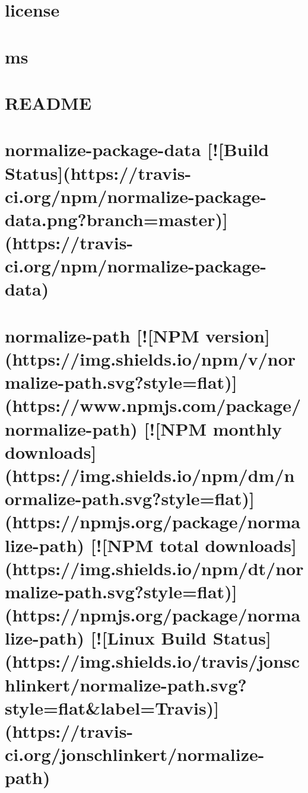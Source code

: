 \documentclass[twoside]{book}
\newcommand{\+}{\discretionary{\mbox{\scriptsize$\hookleftarrow$}}{}{}}
\begin{document}
\chapter{license}
\label{md_dsmacc_examples_DRmerge_node_modules_ms_license}

\chapter{ms}
\label{md_dsmacc_examples_DRmerge_node_modules_ms_readme}

\chapter{R\+E\+A\+D\+ME}
\label{md_dsmacc_examples_DRmerge_node_modules_nopt_README}

\chapter{normalize-\/package-\/data \mbox{[}!\mbox{[}Build Status\mbox{]}(https\+://travis-\/ci.org/npm/normalize-\/package-\/data.png?branch=master)\mbox{]}(https\+://travis-\/ci.org/npm/normalize-\/package-\/data)}
\label{md_dsmacc_examples_DRmerge_node_modules_normalize-package-data_README}

\chapter{normalize-\/path \mbox{[}!\mbox{[}N\+PM version\mbox{]}(https\+://img.shields.\+io/npm/v/normalize-\/path.svg?style=flat)\mbox{]}(https\+://www.npmjs.\+com/package/normalize-\/path) \mbox{[}!\mbox{[}N\+PM monthly downloads\mbox{]}(https\+://img.shields.\+io/npm/dm/normalize-\/path.svg?style=flat)\mbox{]}(https\+://npmjs.org/package/normalize-\/path) \mbox{[}!\mbox{[}N\+PM total downloads\mbox{]}(https\+://img.shields.\+io/npm/dt/normalize-\/path.svg?style=flat)\mbox{]}(https\+://npmjs.org/package/normalize-\/path) \mbox{[}!\mbox{[}Linux Build Status\mbox{]}(https\+://img.shields.\+io/travis/jonschlinkert/normalize-\/path.svg?style=flat\&label=Travis)\mbox{]}(https\+://travis-\/ci.org/jonschlinkert/normalize-\/path)}
\label{md_dsmacc_examples_DRmerge_node_modules_normalize-path_README}

\end{document}
